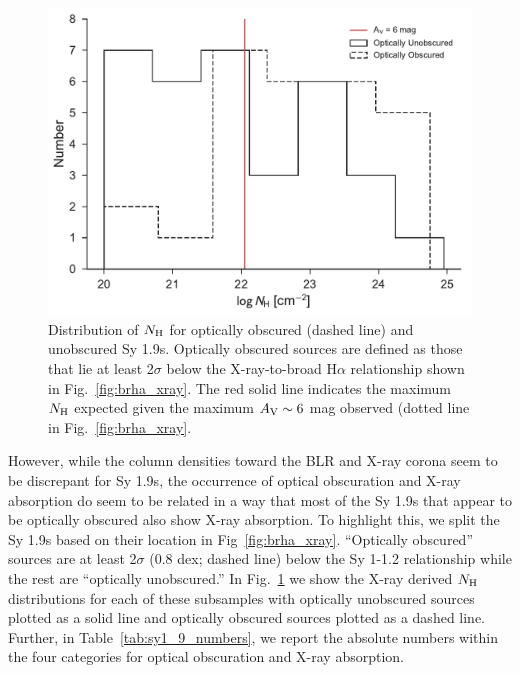 \documentclass[twocolumn,trackchanges]{aastex6}
\newcommand{\halpha}{H$\alpha$}
\newcommand{\nh}{$N_{\rm H}$}
\begin{document}
\begin{figure}
\includegraphics[width=\columnwidth]{../figures/nh_hists_sy1_9_split_optical_obscuration.pdf}
\caption{\label{fig:nh_dist_sy1_9} Distribution of \nh{} for optically obscured (dashed line) and unobscured Sy 1.9s. Optically obscured sources are defined as those that lie at least 2$\sigma$ below the X-ray-to-broad \halpha{} relationship shown in Fig.~\ref{fig:brha_xray}. The red solid line indicates the maximum \nh{} expected given the maximum $A_{\rm{V}}\sim6$ mag observed (dotted line in Fig.~\ref{fig:brha_xray}. }
\end{figure}

However, while the column densities toward the BLR and X-ray corona seem to be discrepant for Sy 1.9s, the occurrence of optical obscuration and X-ray absorption do seem to be related in a way that most of the Sy 1.9s that appear to be optically obscured also show X-ray absorption. To highlight this, we split the Sy 1.9s based on their location in Fig~\ref{fig:brha_xray}. ``Optically obscured'' sources are at least 2$\sigma$ (0.8 dex; dashed line) below the Sy 1-1.2 relationship while the rest are ``optically unobscured.''   In Fig.~\ref{fig:nh_dist_sy1_9} we show the X-ray derived \nh{} distributions for each of these subsamples with optically unobscured sources plotted as a solid line and optically obscured sources plotted as a dashed line. Further, in Table~\ref{tab:sy1_9_numbers}, we report the absolute numbers within the four categories for optical obscuration and X-ray absorption. 
\end{document}
